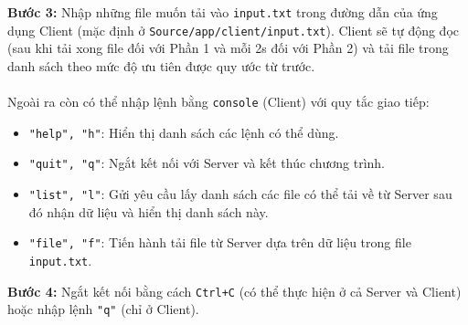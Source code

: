 \documentclass[a4paper,12pt]{report}
\begin{document}
\begin{description}
  \item \textbf{Bước 3:} Nhập những file muốn tải vào \verb|input.txt| trong đường dẫn của ứng dụng Client (mặc định ở \verb|Source/app/client/input.txt|). Client sẽ tự động đọc (sau khi tải xong file đối với Phần 1 và mỗi 2s đối với Phần 2) và tải file trong danh sách theo mức độ ưu tiên được quy ước từ trước.\\ \\
        Ngoài ra còn có thể nhập lệnh bằng \verb|console| (Client) với quy tắc giao tiếp:
        \begin{itemize}
          \item \verb|"help", "h"|: Hiển thị danh sách các lệnh có thể dùng.
          \item \verb|"quit", "q"|: Ngắt kết nối với Server và kết thúc chương trình.
          \item \verb|"list", "l"|: Gửi yêu cầu lấy danh sách các file có thể tải về từ Server sau đó nhận dữ liệu và hiển thị danh sách này.
          \item \verb|"file", "f"|: Tiến hành tải file từ Server dựa trên dữ liệu trong file \verb|input.txt|.
        \end{itemize}
  \item \textbf{Bước 4:} Ngắt kết nối bằng cách \verb|Ctrl+C| (có thể thực hiện ở cả Server và Client) hoặc nhập lệnh \verb|"q"| (chỉ ở Client).
\end{description}

\pagebreak
\end{document}
